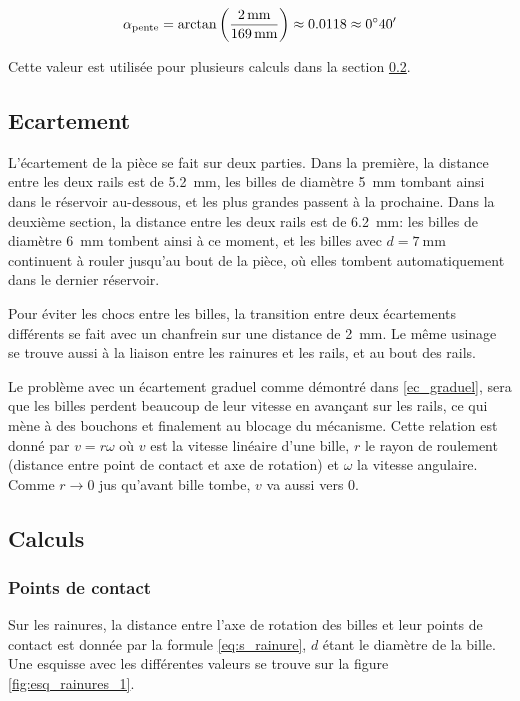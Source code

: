 \[\alpha_{\text{pente}} = \arctan\left(\frac{\SI{2}{\milli\metre}}{\SI{169}{\milli\metre}}\right) \approx \num{0.0118} \approx \sisetup{add-arc-degree-zero} \ang{;40;}\]

Cette valeur est utilisée pour plusieurs calculs dans la section \ref{calculs_tri}.

\subsection{Ecartement}
\label{ecartements}
L'écartement de la pièce se fait sur deux parties. Dans la première, la distance entre les deux rails est de \SI{5.2}{\mm}, les billes de diamètre \SI{5}{\mm} tombant ainsi dans le réservoir au-dessous, et les plus grandes passent à la prochaine. Dans la deuxième section, la distance entre les deux rails est de \SI{6.2}{\mm}: les billes de diamètre \SI{6}{\mm} tombent ainsi à ce moment, et les billes avec $d = \SI{7}{\mm}$ continuent à rouler jusqu'au bout de la pièce, où elles tombent automatiquement dans le dernier réservoir.

Pour éviter les chocs entre les billes, la transition entre deux écartements différents se fait avec un chanfrein sur une distance de \SI{2}{\mm}. Le même usinage se trouve aussi à la liaison entre les rainures et les rails, et au bout des rails.

Le problème avec un écartement graduel comme démontré dans \ref{ec_graduel}, sera que les billes perdent beaucoup de leur vitesse en avançant sur les rails, ce qui mène à des bouchons et finalement au blocage du mécanisme. Cette relation est donné par \(v = r\omega\) où $v$ est la vitesse linéaire d'une bille, $r$ le rayon de roulement (distance entre point de contact et axe de rotation) et $\omega$ la vitesse angulaire. Comme $r \to 0$ jus qu'avant bille tombe, $v$ va aussi vers 0.

\subsection{Calculs}
\label{calculs_tri}
\subsubsection{Points de contact}
Sur les rainures, la distance entre l'axe de rotation des billes et leur points de contact est donnée par la formule \ref{eq:s_rainure}, $d$ étant le diamètre de la bille. Une esquisse avec les différentes valeurs se trouve sur la figure \ref{fig:esq_rainures_1}.

